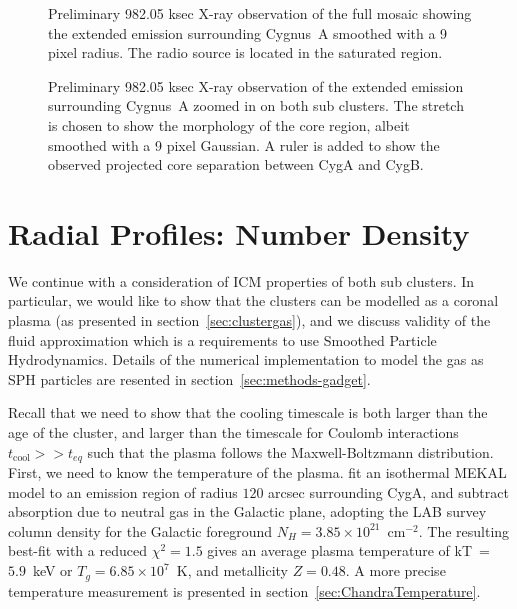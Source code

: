 \documentclass[MScProj_TLRH_ClusterEnergy.tex]{subfiles}
\begin{document}
\begin{figure}
\centering
{}%
\caption{Preliminary 982.05 ksec  X-ray observation of the 
         full mosaic showing the extended emission surrounding Cygnus~A
         \citep[in prep]{2016MNRAS.123..456W} smoothed with a 9 pixel radius.
         The radio source is located in the saturated region.
         }
\label{fig:CygA_Xray_extended}
\end{figure}

\begin{figure}
\centering
{}%
\caption{Preliminary 982.05 ksec  X-ray observation of the 
         extended emission surrounding Cygnus~A \citep[in prep]{2016MNRAS.123..456W}
         zoomed in on both sub clusters. The stretch is chosen to show the 
         morphology of the core region, albeit smoothed with a 9 pixel Gaussian.
         A ruler is added to show the observed projected core separation between
         CygA and CygB.
         }
\label{fig:ruler}
\end{figure}



\section{Radial Profiles: Number Density}
\label{sec:numberdensity}
We continue with a consideration of ICM properties of both sub clusters. In 
particular, we would like to show that the clusters can be modelled as a coronal 
plasma (as presented in section~\ref{sec:clustergas}), and we discuss validity 
of the fluid approximation which is a requirements to use Smoothed Particle 
Hydrodynamics. Details of the numerical implementation to model the gas as SPH
particles are resented in section~\ref{sec:methods-gadget}.

Recall that we need to show that the cooling timescale is both larger than the
age of the cluster, and larger than the timescale for Coulomb interactions 
$t_{\text{cool}} >> t_{eq}$ such that the plasma follows the Maxwell-Boltzmann 
distribution. First, we need to know the temperature of the plasma.
\citet{2016MNRAS.123..456W} fit an isothermal MEKAL 
\citep{1995ApJ...438L.115L,1985A&AS...62..197M} model to an emission region of 
radius $120$ arcsec surrounding CygA, and subtract absorption due to neutral gas 
in the Galactic plane, adopting the LAB survey \citep{2005A&A...440..775K} column
density for the Galactic foreground $N_H = 3.85 \times 10^{21}$~cm$^{-2}$.
The resulting best-fit with a reduced $\chi^2 = 1.5$ gives an average plasma 
temperature of kT~=~$5.9$~keV or $T_g = 6.85 \times 10^7$~K, and metallicity
$Z=0.48$. A more precise temperature measurement is presented in 
section~\ref{sec:ChandraTemperature}.
\end{document}
